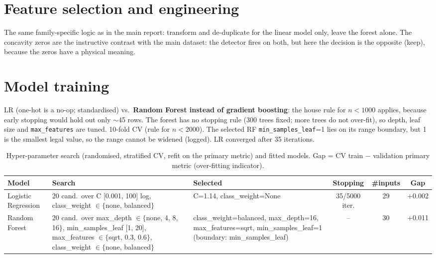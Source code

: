 \documentclass[10pt]{article}
\begin{document}
\section{Feature selection and engineering}
The same family-specific logic as in the main report: transform and de-duplicate for the linear model only, leave the forest alone. The concavity zeros are the instructive contrast with the main dataset: the detector fires on both, but here the decision is the opposite (keep), because the zeros have a physical meaning.

\section{Model training}
LR (one-hot is a no-op; standardised) vs.\ \textbf{Random Forest instead of gradient boosting}: the house rule for $n<1000$ applies, because early stopping would hold out only $\sim$45 rows. The forest has no stopping rule (300 trees fixed; more trees do not over-fit), so depth, leaf size and \texttt{max\_features} are tuned. 10-fold CV (rule for $n<2000$). The selected RF \texttt{min\_samples\_leaf}=1 lies on its range boundary, but 1 is the smallest legal value, so the range cannot be widened (logged). LR converged after 35 iterations. \begin{table}[!htb]\centering\footnotesize\setlength{\tabcolsep}{3pt}
\caption{Hyper-parameter search (randomised, stratified CV, refit on the primary metric) and fitted models. Gap = CV train $-$ validation primary metric (over-fitting indicator).}\label{tab:config}
\begin{tabularx}{\linewidth}{l Y Y c c c}\toprule
Model & Search & Selected & Stopping & \#inputs & Gap\\\midrule
Logistic Regression & 20 cand.\ over C [0.001, 100] log, class\_weight $\in\{$none, balanced$\}$ & C=1.14, class\_weight=None & 35/5000 iter. & 29 & +0.002\\
Random Forest & 20 cand.\ over max\_depth $\in\{$none, 4, 8, 16$\}$, min\_samples\_leaf [1, 20], max\_features $\in\{$sqrt, 0.3, 0.6$\}$, class\_weight $\in\{$none, balanced$\}$ & class\_weight=balanced, max\_depth=16, max\_features=sqrt, min\_samples\_leaf=1 (boundary: min\_samples\_leaf) & -- & 30 & +0.011\\
\bottomrule\end{tabularx}\end{table}
\end{document}
